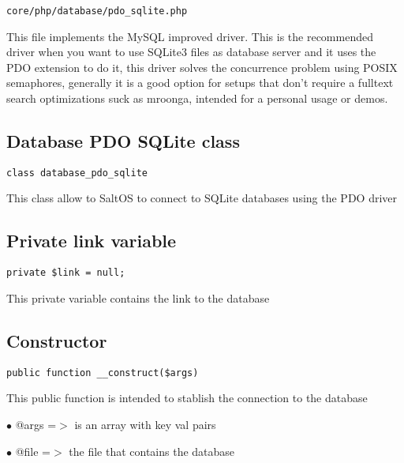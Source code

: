 \documentclass[a4paper]{book}
\begin{document}
\begin{lstlisting}
core/php/database/pdo_sqlite.php
\end{lstlisting}

This file implements the MySQL improved driver. This is the recommended driver when you want
to use SQLite3 files as database server and it uses the PDO extension to do it, this driver
solves the concurrence problem using POSIX semaphores, generally it is a good option for setups
that don't require a fulltext search optimizations suck as mroonga, intended for a personal
usage or demos.

\hypertarget{toc338}{}
\subsection{Database PDO SQLite class}

\begin{lstlisting}
class database_pdo_sqlite
\end{lstlisting}

This class allow to SaltOS to connect to SQLite databases using the PDO driver

\hypertarget{toc339}{}
\subsection{Private link variable}

\begin{lstlisting}
private $link = null;
\end{lstlisting}

This private variable contains the link to the database

\hypertarget{toc340}{}
\subsection{Constructor}

\begin{lstlisting}
public function __construct($args)
\end{lstlisting}

This public function is intended to stablish the connection to the database

\begin{compactitem}
\item[\color{myblue}$\bullet$] @args =$>$ is an array with key val pairs
\item[\color{myblue}$\bullet$] @file =$>$ the file that contains the database
\end{compactitem}
\end{document}
